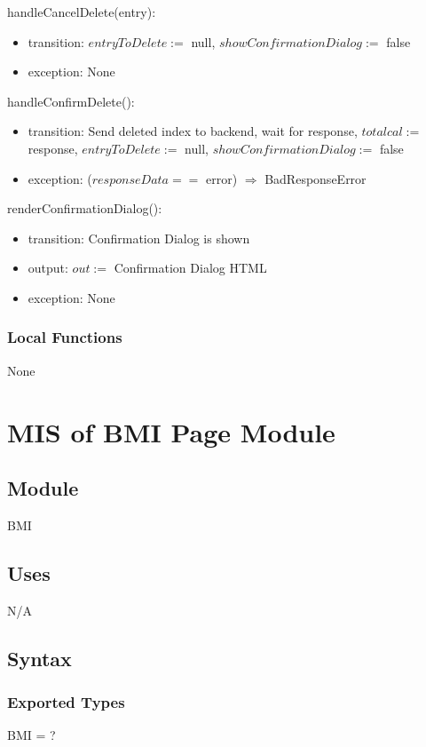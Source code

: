 \documentclass[12pt, titlepage]{article}
\begin{document}
\noindent handleCancelDelete(entry):
\begin{itemize}
	\item transition: $entryToDelete :=$ null, $showConfirmationDialog :=$ false
\item exception: None
\end{itemize}
\noindent handleConfirmDelete():
\begin{itemize}
	\item transition: Send deleted index to backend, wait for response, 
	$totalcal :=$ response, $entryToDelete :=$ null, $showConfirmationDialog 
	:=$ false
	\item exception: ($responseData ==$ error) $\Rightarrow$ BadResponseError
\end{itemize}
\noindent renderConfirmationDialog():
\begin{itemize}
	\item transition: Confirmation Dialog is shown
	\item output: $out :=$ Confirmation Dialog HTML
	\item exception: None
\end{itemize}
\subsubsection{Local Functions}
None

\newpage

\section{MIS of BMI Page Module}
\subsection{Module}
BMI
\subsection{Uses}
N/A
\subsection{Syntax}
\subsubsection{Exported Types}
BMI = ?
\end{document}
